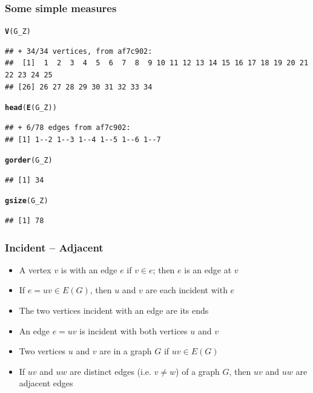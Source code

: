 \documentclass[aspectratio=169]{beamer}\usepackage[]{graphicx}\usepackage[]{xcolor}
\makeatletter
\newcommand{\hldef}[1]{\textcolor[rgb]{0.345,0.345,0.345}{#1}}%
\newcommand{\hlkwd}[1]{\textcolor[rgb]{0.737,0.353,0.396}{\textbf{#1}}}%
\newenvironment{kframe}{%
 \def\at@end@of@kframe{}%
 \ifinner\ifhmode%
  \def\at@end@of@kframe{\end{minipage}}%
  \begin{minipage}{\columnwidth}%
 \fi\fi%
 \def\FrameCommand##1{\hskip\@totalleftmargin \hskip-\fboxsep
 \colorbox{shadecolor}{##1}\hskip-\fboxsep
     \hskip-\linewidth \hskip-\@totalleftmargin \hskip\columnwidth}%
 \MakeFramed {\advance\hsize-\width
   \@totalleftmargin\z@ \linewidth\hsize
   \@setminipage}}%
 {\par\unskip\endMakeFramed%
 \at@end@of@kframe}
\newenvironment{knitrout}{}{} %
\makeatother
\begin{document}
\begin{frame}[fragile]\frametitle{Some simple measures}
\begin{knitrout}
\color{fgcolor}\begin{kframe}
\begin{alltt}
\hlkwd{V}\hldef{(G_Z)}
\end{alltt}
\begin{verbatim}
## + 34/34 vertices, from af7c902:
##  [1]  1  2  3  4  5  6  7  8  9 10 11 12 13 14 15 16 17 18 19 20 21 22 23 24 25
## [26] 26 27 28 29 30 31 32 33 34
\end{verbatim}
\begin{alltt}
\hlkwd{head}\hldef{(}\hlkwd{E}\hldef{(G_Z))}
\end{alltt}
\begin{verbatim}
## + 6/78 edges from af7c902:
## [1] 1--2 1--3 1--4 1--5 1--6 1--7
\end{verbatim}
\begin{alltt}
\hlkwd{gorder}\hldef{(G_Z)}
\end{alltt}
\begin{verbatim}
## [1] 34
\end{verbatim}
\begin{alltt}
\hlkwd{gsize}\hldef{(G_Z)}
\end{alltt}
\begin{verbatim}
## [1] 78
\end{verbatim}
\end{kframe}
\end{knitrout}
\end{frame}

\begin{frame}\frametitle{Incident -- Adjacent}
	\begin{definition}[Incident]
	\begin{itemize}
	\item A vertex $v$ is  with an edge $e$ if $v\in e$; then $e$ is an edge at $v$
	\item If $e=uv\in E(G)$, then $u$ and $v$ are each incident with $e$
	\item The two vertices incident with an edge are its ends
	\item An edge $e=uv$ is incident with both vertices $u$ and $v$
	\end{itemize}
	\end{definition}
	\vfill
	\begin{definition}[Adjacent]
	\begin{itemize}
	\item Two vertices $u$ and $v$ are  in a graph $G$ if $uv\in E(G)$
	\item If $uv$ and $uw$ are distinct edges (i.e. $v\not=w$) of a graph $G$, then $uv$ and $uw$ are adjacent edges
	\end{itemize}
	\end{definition}
\end{frame}
\end{document}
